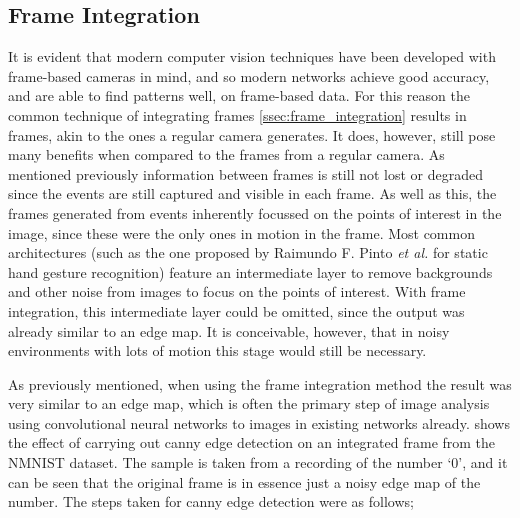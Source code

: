 \subsection{Frame Integration} \label{ssec:frame_integration_testing}

It is evident that modern computer vision techniques have been developed with frame-based cameras in mind, and so modern networks achieve good accuracy, and are able to find patterns well, on frame-based data. For this reason the common technique of integrating frames \cref{ssec:frame_integration} results in frames, akin to the ones a regular camera generates. It does, however, still pose many benefits when compared to the frames from a regular camera. As mentioned previously information between frames is still not lost or degraded since the events are still captured and visible in each frame. As well as this, the frames generated from events inherently focussed on the points of interest in the image, since these were the only ones in motion in the frame. Most common architectures (such as the one proposed by Raimundo F. Pinto \textit{et al.} for static hand gesture recognition\cite{StaticHandGesture}) feature an intermediate layer to remove backgrounds and other noise from images to focus on the points of interest. With frame integration, this intermediate layer could be omitted, since the output was already similar to an edge map. It is conceivable, however, that in noisy environments with lots of motion this stage would still be necessary.

As previously mentioned, when using the frame integration method the result was very similar to an edge map, which is often the primary step of image analysis using convolutional neural networks to images in existing networks already.  shows the effect of carrying out canny edge detection\cite{CannyEdgeDetection} on an integrated frame from the NMNIST dataset. The sample is taken from a recording of the number `0', and it can be seen that the original frame is in essence just a noisy edge map of the number. The steps taken for canny edge detection were as follows;

